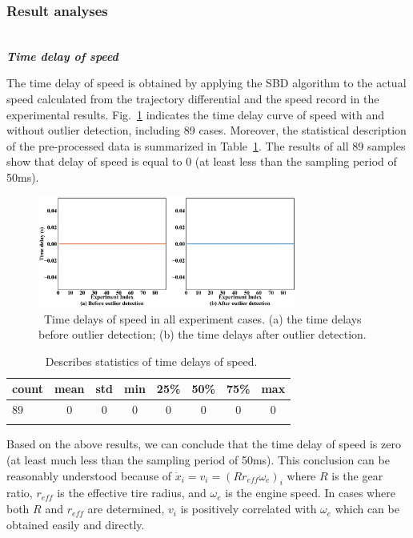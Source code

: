 \documentclass[journal]{IEEEtran}
\begin{document}
\subsubsection{Result analyses}
\label{Section 3.2.2}

~\\

\textbf{\emph{Time delay of speed}}

The time delay of speed is obtained by applying the SBD algorithm to the actual speed calculated from the trajectory differential and the speed record in the experimental results. Fig.~\ref{fig3} indicates the time delay curve of speed with and without outlier detection, including 89 cases. Moreover, the statistical description of the pre-processed data is summarized in Table~\ref{table2}. The results of all 89 samples show that delay of speed is equal to 0 (at least less than the sampling period of 50ms).

\begin{figure}
  \centering
  \includegraphics[width=8.5cm]{figs/fig3.png}
  \caption{~Time delays of speed in all experiment cases. (a) the time delays before outlier detection; (b) the time delays after outlier detection.}
  \label{fig3}
\end{figure}

\begin{table}
  \centering
  \setlength{\abovecaptionskip}{0pt}
  \setlength{\belowcaptionskip}{10pt}%
  \caption{~Describes statistics of time delays of speed.}
  {\begin{tabular}{lccccccc} \toprule      count & mean & std & min & 25\% & 50\% & 75\% & max \\ \midrule
               $89$                           & $0$  & $0$ & $0$ & $0$  & $0$  & $0$  & $0$ \\
               \bottomrule
               \label{table2}
    \end{tabular}}
\end{table}


Based on the above results, we can conclude that the time delay of speed is zero (at least much less than the sampling period of 50ms). This conclusion can be reasonably understood because of ${\dot{x}}_i=v_i=\left(Rr_{eff}\omega_e\right)_i$ where $R$ is the gear ratio, $r_{eff}$ is the effective tire radius, and $\omega_e$ is the engine speed. In cases where both $R$ and $r_{eff}$ are determined, $v_i$ is positively correlated with $\omega_e$ which can be obtained easily and directly.
\end{document}
